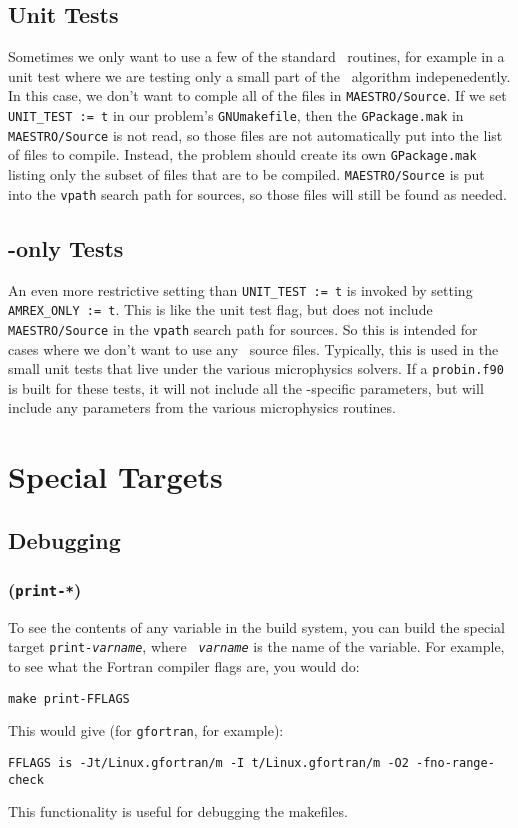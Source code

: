 \subsection{Unit Tests}

Sometimes we only want to use a few of the standard \maestro\
routines, for example in a unit test where we are testing only a small
part of the \maestro\ algorithm indepenedently.  In this case, we
don't want to comple all of the files in {\tt MAESTRO/Source}.  If we
set {\tt UNIT\_TEST := t} in our problem's {\tt GNUmakefile}, then the
{\tt GPackage.mak} in {\tt MAESTRO/Source} is not read, so those files
are not automatically put into the list of files to compile.  Instead,
the problem should create its own {\tt GPackage.mak} listing only the
subset of files that are to be compiled.  {\tt MAESTRO/Source} is put
into the {\tt vpath} search path for sources, so those files will
still be found as needed.


\subsection{\fboxlib-only Tests}

An even more restrictive setting than {\tt UNIT\_TEST := t} is invoked
by setting {\tt AMREX\_ONLY := t}.  This is like the unit test flag,
but does not include {\tt MAESTRO/Source} in the {\tt vpath} search
path for sources.  So this is intended for cases where we don't want
to use any \maestro\ source files.  Typically, this is used in the
small unit tests that live under the various microphysics solvers.  If
a {\tt probin.f90} is built for these tests, it will not include all
the \maestro-specific parameters, but will include any parameters from
the various microphysics routines.


\section{Special Targets}

\subsection{Debugging}

\subsubsection{({\tt print-*})}

To see the contents of any variable in the build system, you can build
the special target {\tt print-{\em varname}}, where {\tt {\em
varname}} is the name of the variable.  For example, to see what the
Fortran compiler flags are, you would do:
\begin{verbatim}
make print-FFLAGS
\end{verbatim}
This would give (for {\tt gfortran}, for example):
\begin{verbatim}
FFLAGS is -Jt/Linux.gfortran/m -I t/Linux.gfortran/m -O2 -fno-range-check
\end{verbatim}
This functionality is useful for debugging the makefiles.

